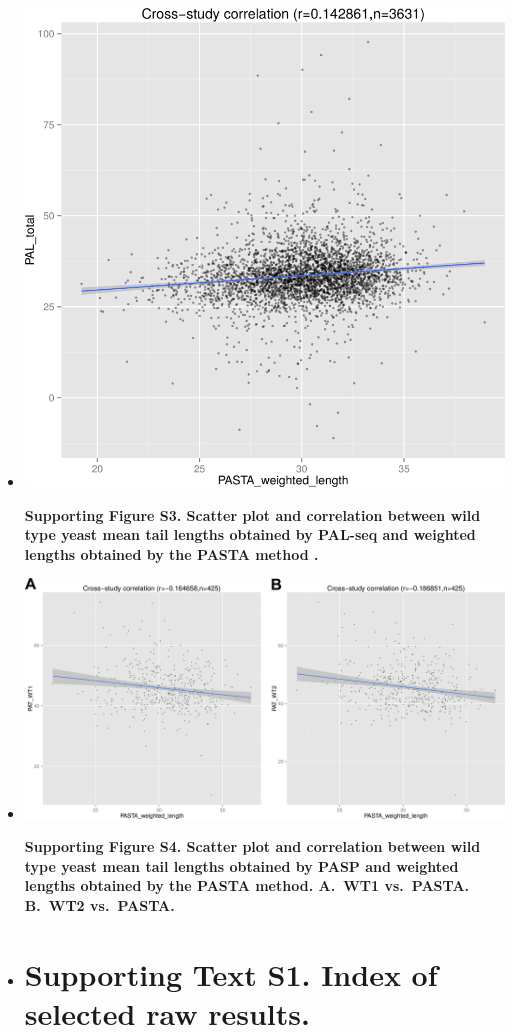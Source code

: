 \documentclass[10pt]{article}
\begin{document}
\begin{itemize}
\item[]{
\begin{center}
\includegraphics[scale=1.25]{FigureS3.png}
\end{center}

\textbf{Supporting Figure S3. Scatter plot and correlation between wild type yeast mean tail lengths obtained by PAL-seq \cite{subtelny14} and weighted lengths obtained by the PASTA method \cite{beilharz07}. }
}
\newpage

\item[]{
\begin{center}
\includegraphics[scale=0.45]{FigureS4.png}
\end{center}

\textbf{Supporting Figure S4. Scatter plot and correlation between wild type yeast mean tail lengths obtained by PASP and weighted lengths obtained by the PASTA method. \textbf{A.}~WT1 vs.\ PASTA. \textbf{B.}~WT2 vs.\ PASTA.}
}
\newpage

\item[]{
\section{\textbf{Supporting Text S1. Index of selected raw results.}}
}

\end{itemize}
\end{document}
